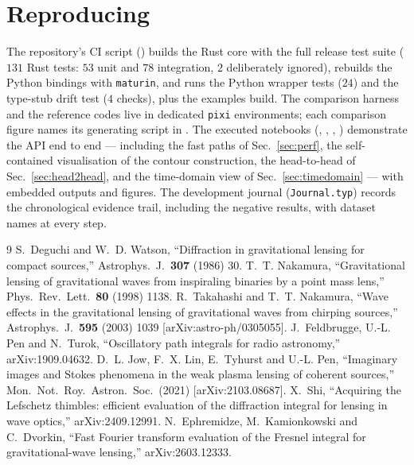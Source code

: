 \documentclass[11pt,a4paper]{article}
\begin{document}
\section{Reproducing}
\label{app:repro}
The repository's CI script () builds the Rust core
with the full release test suite ($131$ Rust tests: $53$ unit and $78$
integration, $2$ deliberately ignored), rebuilds the Python bindings with
\texttt{maturin}, and runs the Python wrapper tests ($24$) and the
type-stub drift test ($4$ checks), plus the examples build.  The comparison harness and the
reference codes live in dedicated \texttt{pixi} environments; each
comparison figure names its generating script in
.  The executed notebooks
(, ,
, )
demonstrate the API end to end --- including the fast paths of
Sec.~\ref{sec:perf}, the self-contained visualisation of the contour
construction, the head-to-head of Sec.~\ref{sec:head2head}, and the
time-domain view of Sec.~\ref{sec:timedomain} --- with embedded outputs and
figures.  The development journal
(\texttt{Journal.typ}) records the chronological evidence trail, including
the negative results, with dataset names at every step.

\begin{thebibliography}{9}
 S.~Deguchi and W.~D. Watson,
  ``Diffraction in gravitational lensing for compact sources,''
  Astrophys.\ J.\ \textbf{307} (1986) 30.
 T.~T. Nakamura,
  ``Gravitational lensing of gravitational waves from inspiraling
  binaries by a point mass lens,'' Phys.\ Rev.\ Lett.\ \textbf{80} (1998)
  1138.
 R.~Takahashi and T.~T. Nakamura,
  ``Wave effects in the gravitational lensing of gravitational waves from
  chirping sources,'' Astrophys.\ J.\ \textbf{595} (2003) 1039
  [arXiv:astro-ph/0305055].
 J.~Feldbrugge, U.-L. Pen and N.~Turok,
  ``Oscillatory path integrals for radio astronomy,''
  arXiv:1909.04632.
 D.~L. Jow, F.~X. Lin, E.~Tyhurst and U.-L. Pen,
  ``Imaginary images and Stokes phenomena in the weak plasma lensing of
  coherent sources,'' Mon.\ Not.\ Roy.\ Astron.\ Soc.\ (2021)
  [arXiv:2103.08687].
 X.~Shi,
  ``Acquiring the Lefschetz thimbles: efficient evaluation of the
  diffraction integral for lensing in wave optics,''
  arXiv:2409.12991.
 N.~Ephremidze, M.~Kamionkowski and C.~Dvorkin,
  ``Fast Fourier transform evaluation of the Fresnel integral for
  gravitational-wave lensing,'' arXiv:2603.12333.
\end{thebibliography}
\end{document}
